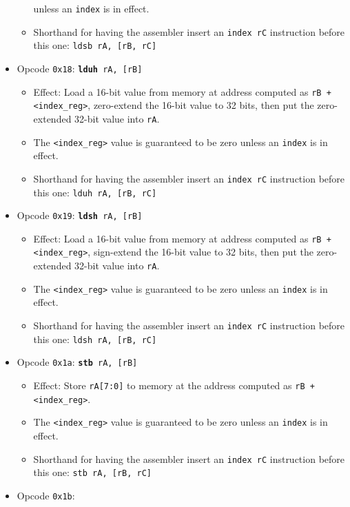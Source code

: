 \documentclass{article}
\begin{document}
\begin{itemize}
\begin{itemize}
		unless an \texttt{index} is in effect.
		\item Shorthand for having the assembler insert an
		\texttt{index rC} instruction before this one:
			\texttt{ldsb rA, [rB, rC]}
		\end{itemize}
	\item Opcode \texttt{0x18}:
		\texttt{\textbf{lduh} rA, [rB]}
		\begin{itemize}
		\item Effect: Load a 16-bit value from memory at address
		computed as \texttt{rB + <index\_reg>}, zero-extend
		the 16-bit value to 32 bits, then put the zero-extended 32-bit
		value into \texttt{rA}.
		\item The \texttt{<index\_reg>} value is guaranteed to be zero
		unless an \texttt{index} is in effect.
		\item Shorthand for having the assembler insert an
		\texttt{index rC} instruction before this one:
			\texttt{lduh rA, [rB, rC]}
		\end{itemize}
	\item Opcode \texttt{0x19}:
		\texttt{\textbf{ldsh} rA, [rB]}
		\begin{itemize}
		\item Effect: Load a 16-bit value from memory at address
		computed as \texttt{rB + <index\_reg>}, sign-extend
		the 16-bit value to 32 bits, then put the zero-extended 32-bit
		value into \texttt{rA}.
		\item The \texttt{<index\_reg>} value is guaranteed to be zero
		unless an \texttt{index} is in effect.
		\item Shorthand for having the assembler insert an
		\texttt{index rC} instruction before this one:
			\texttt{ldsh rA, [rB, rC]}
		\end{itemize}
	\item Opcode \texttt{0x1a}:
		\texttt{\textbf{stb} rA, [rB]}
		\begin{itemize}
		\item Effect: Store \texttt{rA[7:0]} to memory at the address
		computed as \texttt{rB + <index\_reg>}.
		\item The \texttt{<index\_reg>} value is guaranteed to be zero
		unless an \texttt{index} is in effect.
		\item Shorthand for having the assembler insert an
		\texttt{index rC} instruction before this one:
			\texttt{stb rA, [rB, rC]}
		\end{itemize}
	\item Opcode \texttt{0x1b}:

\end{itemize}
\end{document}
